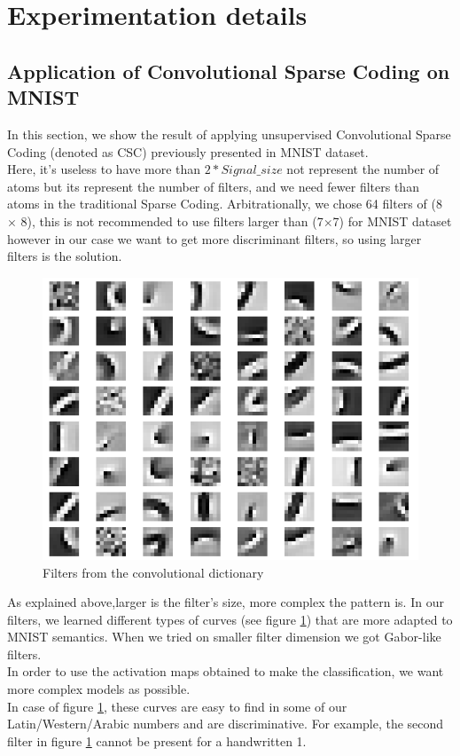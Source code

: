 \section{Experimentation details}
\subsection{Application of Convolutional Sparse Coding on MNIST}
In this section, we show the result of applying unsupervised Convolutional Sparse Coding (denoted as CSC) previously presented in MNIST dataset.\\
Here, it's useless to have more than $2* Signal\_size$ not represent the number of atoms but its represent the number of filters, and we need fewer filters than atoms in the traditional Sparse Coding. Arbitrationally, we chose 64 filters of (8 $\times$ 8), this is not recommended to use filters larger than (7$\times$7) for MNIST dataset  \cite{best-practices-for-convolutional-neural-networks-applied-to-visual-document-analysis} however in our case we want to get more discriminant filters, so using larger filters is the solution.\\

\begin{figure}[h]
 \centering
 \includegraphics[scale=1]{CSC_D.png}
 \caption{Filters from the convolutional dictionary}
 \label{fig:CSC_D}
\end{figure}
As explained above,larger is the filter's size, more complex the pattern is. In our filters, we learned different types of curves (see figure \ref{fig:CSC_D}) that are more adapted to MNIST semantics. When we tried on smaller filter dimension we got  Gabor-like filters.\\
In order to use the activation maps obtained to make the classification, we want more complex models as possible. \\
In case of figure \ref{fig:CSC_D}, these curves are easy to find in some of our Latin/Western/Arabic numbers and are discriminative. For example, the second filter in figure \ref{fig:CSC_D} cannot be present for a handwritten 1.\\


